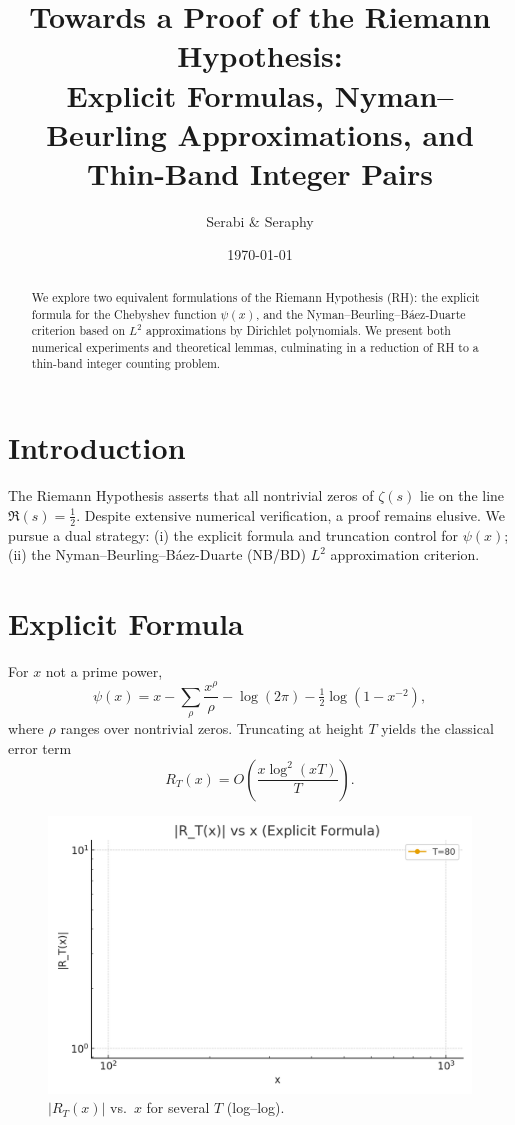 \documentclass[12pt]{article}
\title{Towards a Proof of the Riemann Hypothesis:\\
Explicit Formulas, Nyman--Beurling Approximations, and Thin-Band Integer Pairs}
\author{Serabi \& Seraphy}
\date{\today}
\theoremstyle{plain}
\begin{document}
\maketitle

\begin{abstract}
We explore two equivalent formulations of the Riemann Hypothesis (RH): the explicit formula for the Chebyshev function $\psi(x)$, and the Nyman--Beurling--B\'aez-Duarte criterion based on $L^2$ approximations by Dirichlet polynomials. We present both numerical experiments and theoretical lemmas, culminating in a reduction of RH to a thin-band integer counting problem.
\end{abstract}

\section{Introduction}
The Riemann Hypothesis asserts that all nontrivial zeros of $\zeta(s)$ lie on the line $\Re(s)=\tfrac12$. Despite extensive numerical verification, a proof remains elusive. We pursue a dual strategy: (i) the explicit formula and truncation control for $\psi(x)$; (ii) the Nyman--Beurling--B\'aez-Duarte (NB/BD) $L^2$ approximation criterion.

\section{Explicit Formula}
For $x$ not a prime power,
\begin{equation}\label{eq:exp-formula}
\psi(x)=x-\sum_{\rho}\frac{x^{\rho}}{\rho}-\log(2\pi)-\tfrac12\log(1-x^{-2}),
\end{equation}
where $\rho$ ranges over nontrivial zeros. Truncating at height $T$ yields the classical error term
\begin{equation}\label{eq:trunc-error}
R_T(x)=O\!\left(\frac{x\log^2(xT)}{T}\right).
\end{equation}

\begin{figure}[h!]
\centering
\includegraphics[width=0.8\linewidth]{figA_explicit_formula_R_vs_x.png}
\caption{$|R_T(x)|$ vs.\ $x$ for several $T$ (log--log).}
\end{figure}
\end{document}
